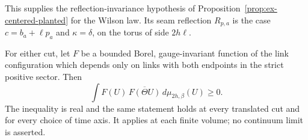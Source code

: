 This supplies the reflection-invariance hypothesis of
Proposition~\ref{prop:ex-centered-planted} for the Wilson law. Its seam
reflection $R_{p,a}$ is the case $c=b_a+\ell p_a$ and $\kappa=\delta$, on the
torus of side $2h\ell$.

\begin{proposition}
\label{prop:ex-lattice-finite-reflection}
For either cut, let $F$ be a bounded Borel, gauge-invariant function of the
link configuration which depends only on links with both endpoints in the
strict positive sector. Then
\[
 \int F(U)\,\overline{F(\Theta U)}\,d\mu_{2h,\beta}(U)\geq0.
\]
The inequality is real and the same statement holds at every translated cut
and for every choice of time axis. It applies at each finite volume; no
continuum limit is asserted.
\end{proposition}

